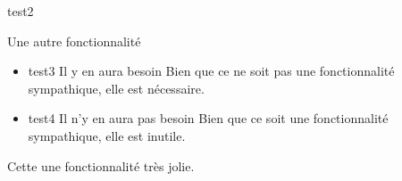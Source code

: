 \fonction
{test2}
{
	Une autre fonctionnalité
	\begin{itemize}
		\item \subfonction
			{test3}
			{Il y en aura besoin}
			{Bien que ce ne soit pas une fonctionnalité sympathique, elle est nécessaire.}
		\item \subfonction
			{test4}
			{Il n'y en aura pas besoin}
			{Bien que ce soit une fonctionnalité sympathique, elle est inutile.}
	\end{itemize}
}
{Cette une fonctionnalité très jolie.}
